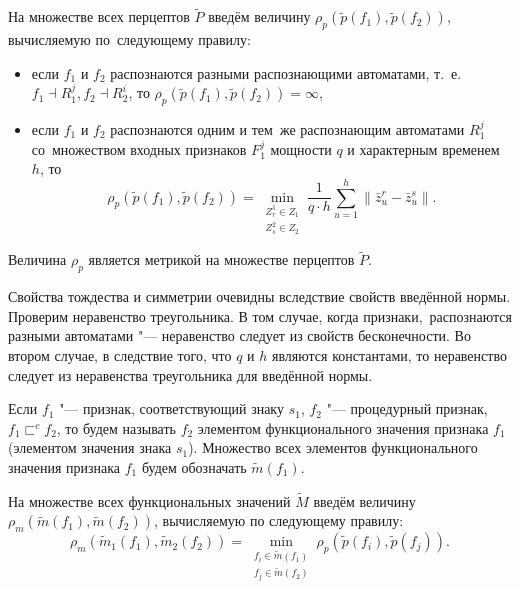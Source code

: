 На множестве всех перцептов $\tilde P$ введём величину $\rho_p(\tilde p(f_1),\tilde p(f_2))$, вычисляемую по~следующему правилу:
\begin{itemize}
	\item если $f_1$ и $f_2$ распознаются разными распознающими автоматами, т.~е. $f_1\dashv R_1^j, f_2\dashv R_2^i$, то $\rho_p(\tilde p(f_1),\tilde p(f_2))=\infty$,
	\item если $f_1$ и $f_2$ распознаются одним и тем~же распознающим автоматами $R_1^j$ со~множеством входных признаков $F_1^j$ мощности $q$ и характерным временем $h$, то
	\begin{equation}
		\rho_p(\tilde p(f_1),\tilde p(f_2))=\min\limits_{\substack{Z_r^1\in Z_1\\Z_s^2\in Z_2}}\frac{1}{q\cdot h}\sum\limits_{u=1}^h\|\bar z_u^r-\bar z_u^s\|.
	\end{equation} 
\end{itemize}

\begin{Pred}
	Величина $\rho_p$ является метрикой на множестве перцептов $\tilde P$.
\end{Pred}

\begin{Proof}
	Свойства тождества и симметрии очевидны вследствие свойств введённой нормы. Проверим неравенство треугольника. В том случае, когда признаки,~распознаются разными автоматами "--- неравенство следует из свойств бесконечности. Во втором случае, в следствие того, что $q$ и $h$ являются константами, то неравенство следует из неравенства треугольника для введённой нормы.
\end{Proof}

\begin{Def}
	Если $f_1$ "--- признак, соответствующий знаку $s_1$, $f_2$ "--- процедурный признак, $f_1\sqsubset^c f_2$, то будем называть $f_2$ элементом функционального значения признака $f_1$ (элементом значения знака $s_1$). Множество всех элементов функционального значения признака $f_1$ будем обозначать $\tilde m(f_1)$.
\end{Def}

На множестве всех функциональных значений $\tilde M$ введём величину $\rho_m(\tilde m(f_1),\tilde m(f_2))$, вычисляемую по следующему правилу:
\begin{equation}\label{eq:m_metr}
	\rho_m(\tilde m_1(f_1),\tilde m_2(f_2 ))=\min\limits_{\substack{f_i\in\tilde m(f_1 )\\f_j\in\tilde m(f_2 )}}\rho_p(\tilde p(f_i ),\tilde p(f_j )).
\end{equation}

